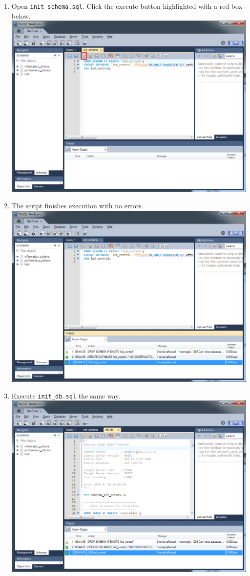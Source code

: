 \begin{enumerate}
\item
  Open \texttt{init\_schema.sql}. Click the execute button highlighted
  with a red box below. \includegraphics{../img/db_init_7.png}
\item
  The script finishes execution with no errors.
  \includegraphics{../img/db_init_8.png}
\item
  Execute \texttt{init\_db.sql} the same way.
  \includegraphics{../img/db_init_9.png}

\end{enumerate}
